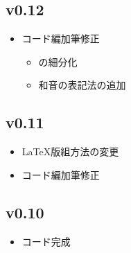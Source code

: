 \documentclass[dvipdfmx,uplatex,b5paper,openany,jbase=12Q,nomag*,textwidth-limit=44%
               ]{gachimuchi}
\begin{document}
\subsection*{v0.12}
\begin{itemize}
  \item コード編加筆修正
  \begin{itemize}
    \item {}の細分化
    \item 和音の表記法の追加
  \end{itemize}
\end{itemize}
\subsection{v0.11}
\begin{itemize}
  \item \LaTeX 版組方法の変更
  \item コード編加筆修正
\end{itemize}
\subsection{v0.10}
\begin{itemize}
  \item コード完成
\end{itemize}
\end{document}

